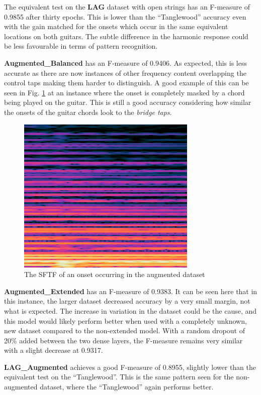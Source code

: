 \documentclass[conference]{IEEEtran}
\begin{document}
The equivalent test on the \textbf{LAG} dataset with open strings has an F-measure of 0.9855 after thirty epochs. This is lower than the ``Tanglewood'' accuracy even with the gain matched for the onsets which occur in the same equivalent locations on both guitars. The subtle difference in the
harmonic response could be less favourable in terms of pattern recognition.

\textbf{Augmented\_Balanced} has an F-measure of 0.9406. As expected, this is less accurate as there are now instances of other frequency content overlapping the control taps making them harder
to distinguish. A good example of this can be seen in Fig. \ref{augmented-bridge} at an instance where the onset is completely masked by a chord being played on the guitar. This is still a good accuracy considering how similar the onsets of the guitar chords
look to the \emph{bridge taps}.

\begin{figure}[htbp]
    \centerline{\includegraphics[scale=0.4]{augmented-bridge.png}}
    \caption{The SFTF of an onset occurring in the augmented dataset}
    \label{augmented-bridge}
    \end{figure}


\textbf{Augmented\_Extended} has an F-measure of 0.9383. It can be seen here that in this instance, the larger dataset decreased accuracy by a very small margin, not what is expected. The increase in variation in the
dataset could be the cause, and this model would likely perform better when used with a completely unknown, new dataset compared to the non-extended model.
With a random dropout of 20\% added between the two dense layers, the F-measure remains very similar with a slight decrease at 0.9317.

\textbf{LAG\_Augmented} achieves a good F-measure of 0.8955, slightly lower than the equivalent test on the ``Tanglewood''. This is the same pattern seen for the non-augmented dataset, where the ``Tanglewood'' again performs better.
\end{document}
